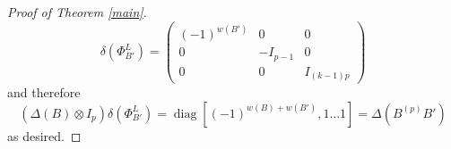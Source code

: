 \documentclass[11pt]{amsart}
\def\s{{\sigma}}
\newcommand\diag{\operatorname{diag}}
\begin{document}
\begin{proof}[Proof of Theorem \ref{main}]
$$\delta\left(\Phi_{B'}^L\right) = 
\left( \begin{array}{ccc}
(-1)^{w(B')} & 0 & 0 \\
0 & -I_{p-1} & 0 \\
0 & 0 & I_{(k-1)p} \end{array} \right)
$$
\noindent and therefore
$$
\left(\Delta(B)\otimes I_p\right)\delta\left(\Phi_{B'}^L\right) = \diag[(-1)^{w(B) + w(B')},1\ldots 1] = \Delta(B^{(p)}B')
$$
\noindent as desired.
\end{proof}






\end{document}
